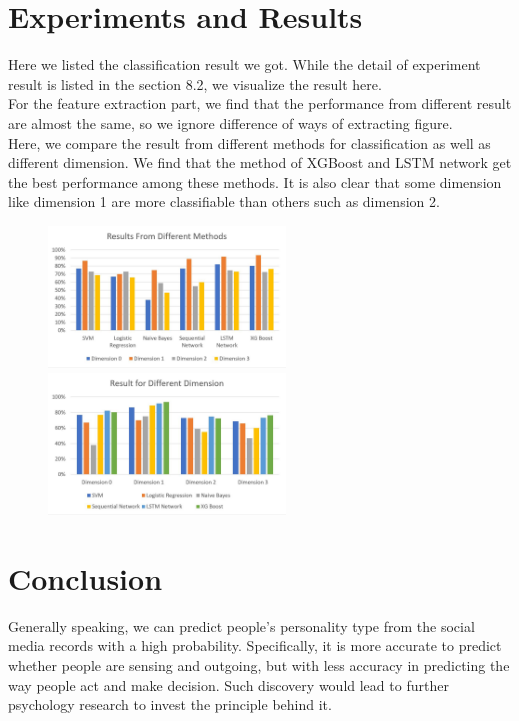 \documentclass{article}
\begin{document}
\section{Experiments and Results}
Here we listed the classification result we got. While the detail of experiment result is listed in the section 8.2, we visualize the result here.\\
For the feature extraction part, we find that the performance from different result are almost the same, so we ignore difference of ways of extracting figure. \\
Here, we compare the result from different methods for classification as well as different dimension. We find that the method of XGBoost and LSTM network get the best performance among these methods. It is also clear that some dimension like dimension 1 are more classifiable than others such as dimension 2.
\begin{figure}[h]
	\centering
	\includegraphics[width=6.3cm]{fig/result1.jpg}
	\includegraphics[width=6.3cm]{fig/result2.jpg}
	\label{fig:result}
\end{figure}

\section{Conclusion}
Generally speaking, we can predict people's personality type from the social media records with a high probability. Specifically, it is more accurate to predict whether people are sensing and outgoing, but with less accuracy in predicting the way people act and make decision. Such discovery would lead to further psychology research to invest the principle behind it.
\end{document}
